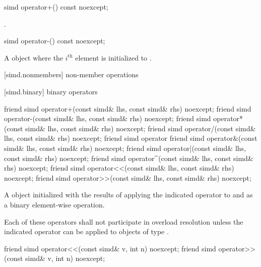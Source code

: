 \begin{itemdecl}
simd operator+() const noexcept;
\end{itemdecl}

\begin{itemdescr}
  \pnum\returns
  .
\end{itemdescr}

\begin{itemdecl}
simd operator-() const noexcept;
\end{itemdecl}

\begin{itemdescr}
  \pnum\returns
  A  object where the $i^\text{th}$ element is initialized to  \foralli.
\end{itemdescr}

[simd.nonmembers]{ non-member operations}

[simd.binary]{ binary operators}

\begin{itemdecl}
friend simd operator+(const simd& lhs, const simd& rhs) noexcept;
friend simd operator-(const simd& lhs, const simd& rhs) noexcept;
friend simd operator*(const simd& lhs, const simd& rhs) noexcept;
friend simd operator/(const simd& lhs, const simd& rhs) noexcept;
friend simd operator%
friend simd operator&(const simd& lhs, const simd& rhs) noexcept;
friend simd operator|(const simd& lhs, const simd& rhs) noexcept;
friend simd operator^(const simd& lhs, const simd& rhs) noexcept;
friend simd operator<<(const simd& lhs, const simd& rhs) noexcept;
friend simd operator>>(const simd& lhs, const simd& rhs) noexcept;
\end{itemdecl}

\begin{itemdescr}
  \pnum\returns
  A  object initialized with the results of applying the indicated operator to  and  as a binary element-wise operation.

  \pnum\remarks
  Each of these operators shall not participate in overload resolution unless the indicated operator can be applied to objects of type .
\end{itemdescr}

\begin{itemdecl}
friend simd operator<<(const simd& v, int n) noexcept;
friend simd operator>>(const simd& v, int n) noexcept;
\end{itemdecl}

